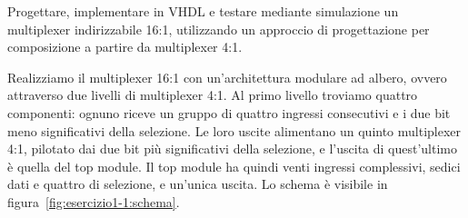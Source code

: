 \label{sec:esercizio1-1}

\begin{traccia}
Progettare, implementare in VHDL e testare mediante simulazione un multiplexer indirizzabile 16:1, utilizzando un approccio di progettazione per composizione a partire da multiplexer 4:1.
\end{traccia}

\progetto

Realizziamo il multiplexer 16:1 con un'architettura modulare ad albero, ovvero attraverso due livelli di multiplexer 4:1. Al primo livello troviamo quattro componenti: ognuno riceve un gruppo di quattro ingressi consecutivi e i due bit meno significativi della selezione. Le loro uscite alimentano un quinto multiplexer 4:1, pilotato dai due bit più significativi della selezione, e l'uscita di quest'ultimo è quella del top module. Il top module ha quindi venti ingressi complessivi, sedici dati e quattro di selezione, e un'unica uscita. Lo schema è visibile in figura~\ref{fig:esercizio1-1:schema}.

